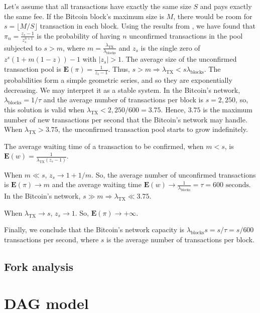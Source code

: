 Let's assume that all transactions have exactly the same size $S$ and pays exactly the same fee. If the Bitcoin block's maximum size is $M$, there would be room for $s = \lfloor M/S \rfloor$ transaction in each block. Using the results from \citet{bailey1954queueing}, we have found that $\pi_n = \frac{z_s-1}{z_s^{n+1}}$ is the probability of having $n$ unconfirmed transactions in the pool subjected to $s > m$, where $m=\frac{\lambda_{\text{TX}}}{\lambda_{\text{blocks}}}$ and $z_s$ is the single zero of $z^s(1+m(1-z))-1$ with $|z_s|>1$. The average size of the unconfirmed transaction pool is $\mathbf{E}(\pi) = \frac{1}{z_s - 1}$. Thus, $s > m \Rightarrow \lambda_{\text{TX}} < s \lambda_{\text{blocks}}$. The probabilities form a simple geometric series, and so they are exponentially decreasing. We may interpret it as a stable system. In the Bitcoin's network, $\lambda_{\text{blocks}} = 1/\tau$ and the average number of transactions per block is $s=2,250$, so, this solution is valid when $\lambda_{\text{TX}} < 2,250/600 = 3.75$. Hence, $3.75$ is the maximum number of new transactions per second that the Bitcoin's network may handle. When $\lambda_{\text{TX}} > 3.75$, the unconfirmed transaction pool starts to grow indefinitely.

The average waiting time of a transaction to be confirmed, when $m < s$, is $\mathbf{E}(w) = \frac{1}{\lambda_{\text{TX}} (z_s-1)}$.

When $m \ll s$, $z_s \rightarrow 1 + 1/m$. So, the average number of unconfirmed transactions is $\mathbf{E}(\pi) \rightarrow m$ and the average waiting time $\mathbf{E}(w) \rightarrow \frac{1}{\lambda_{\text{blocks}}} = \tau = 600 \text{ seconds}$. In the Bitcoin's network, $s \gg m \Rightarrow \lambda_{\text{TX}} \ll 3.75$.

When $\lambda_{\text{TX}} \rightarrow s$, $z_s \rightarrow 1$. So, $\mathbf{E}(\pi) \rightarrow +\infty$.

Finally, we conclude that the Bitcoin's network capacity is $\lambda_{\text{blocks}} s = s/\tau = s/600$ transactions per second, where $s$ is the average number of transactions per block.


\section{Fork analysis}


\chapter{DAG model}

